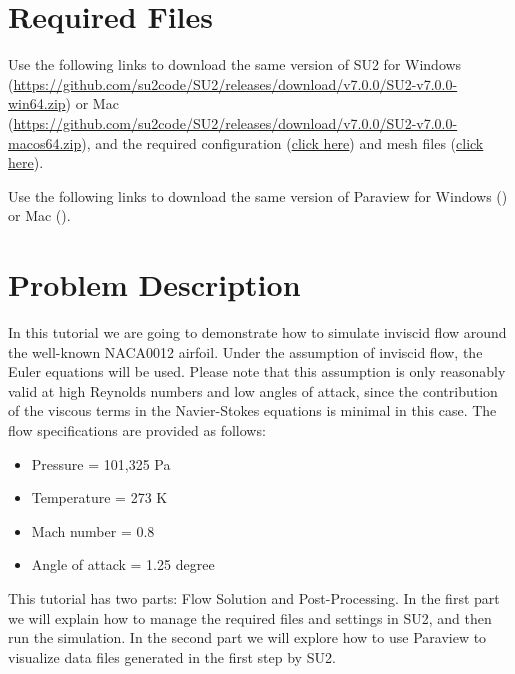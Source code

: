 \section{Required Files}
\begin{su2note}
	Use the following links to download the same version of SU2 for Windows (\href{}{https://github.com/su2code/SU2/releases/download/v7.0.0/SU2-v7.0.0-win64.zip}) or Mac (\href{}{https://github.com/su2code/SU2/releases/download/v7.0.0/SU2-v7.0.0-macos64.zip}), and the required configuration (\href{}{click here}) and mesh files (\href{}{click here}).
\end{su2note}
\begin{paraviewnote}
	Use the following links to download the same version of Paraview for Windows (\href{}{}) or Mac (\href{}{}).
\end{paraviewnote}

\section{Problem Description}
In this tutorial we are going to demonstrate how to simulate inviscid flow around the well-known NACA0012 airfoil. Under the assumption of inviscid flow, the Euler equations will be used. Please note that this assumption is only reasonably valid at high Reynolds numbers and low angles of attack, since the contribution of the viscous terms in the Navier-Stokes equations is minimal in this case. The flow specifications are provided as follows:
\begin{itemize}
    \item Pressure = 101,325 Pa
    \item Temperature = 273 K
    \item Mach number = 0.8
    \item Angle of attack = 1.25 degree
\end{itemize}
This tutorial has two parts: Flow Solution and Post-Processing. In the first part we will explain how to manage the required files and settings in SU2, and then run the simulation. In the second part we will explore how to use Paraview to visualize data files generated in the first step by SU2.
